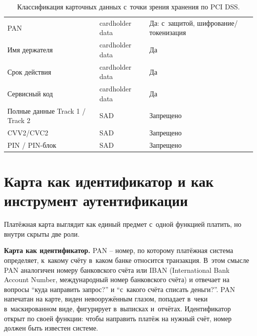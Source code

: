 \begin{table}[H]
  \begingroup
  \small
  \setlength{\tabcolsep}{4pt}
  \renewcommand{\arraystretch}{1.2}
  \begin{tabularx}{\textwidth}{
      @{}B{0.27\textwidth}
      P{0.25\textwidth}
      Y@{}
    }
    \toprule
    \headrow
     &  &
     \\
    \midrule
    PAN & cardholder data &
    \textcolor{Good}{Да: с~защитой, шифрование/токенизация} \\
    Имя держателя & cardholder data &
    \textcolor{Good}{Да} \\
    Срок действия & cardholder data &
    \textcolor{Good}{Да} \\
    Сервисный код & cardholder data &
    \textcolor{Good}{Да} \\
    Полные данные Track 1 / Track 2 & SAD &
    \textcolor{Bad}{Запрещено} \\
    CVV2/CVC2 & SAD &
    \textcolor{Bad}{Запрещено} \\
    PIN / PIN-блок & SAD &
    \textcolor{Bad}{Запрещено} \\
    \bottomrule
  \end{tabularx}%
  \endgroup
  \caption{Классификация карточных данных с~точки зрения хранения по PCI DSS.}\label{fig:card-data-storage}
\end{table}
\section{Карта как идентификатор и как инструмент аутентификации}\label{sec:card-data-identity-vs-auth}

Платёжная карта выглядит как единый предмет с~одной функцией платить,
но внутри скрыты две роли.

\textbf{Карта как идентификатор.} PAN -- номер, по которому платёжная
система определяет, к~какому счёту в~каком банке относится транзакция.
В~этом смысле PAN аналогичен номеру банковского счёта или IBAN
(International Bank Account Number, международный номер банковского счёта)
и отвечает на вопросы \enquote{куда направить запрос?} и
\enquote{с~какого счёта списать деньги?}. PAN напечатан на карте,
виден невооружённым глазом, попадает в~чеки в~маскированном виде,
фигурирует в~выписках и~отчётах. Идентификатор открыт по своей функции: чтобы направить
платёж на нужный счёт, номер должен быть известен системе.

